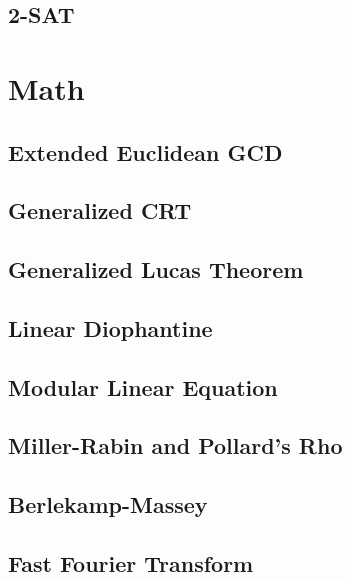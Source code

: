 \subsection{2-SAT}

\section{Math}
\subsection{Extended Euclidean GCD}

\subsection{Generalized CRT}

\subsection{Generalized Lucas Theorem}

\subsection{Linear Diophantine}

\subsection{Modular Linear Equation}

\subsection{Miller-Rabin and Pollard's Rho}

\subsection{Berlekamp-Massey}

\subsection{Fast Fourier Transform}


